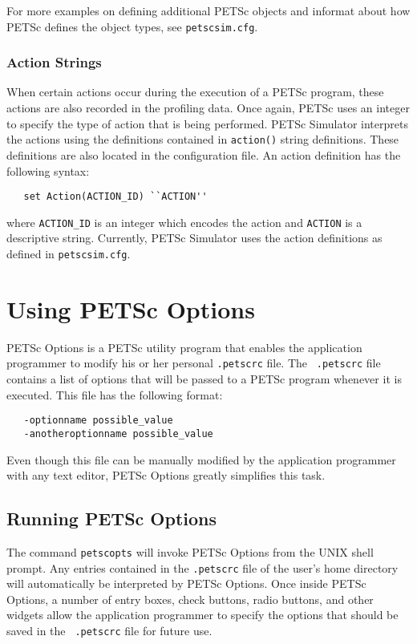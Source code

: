 For more examples on defining additional PETSc objects and informat
about how PETSc defines the object types, see {\tt petscsim.cfg}.

\subsubsection{Action Strings}

When certain actions occur during the execution of a PETSc program,
these actions are also recorded in the profiling data.  Once again,
PETSc uses an integer to specify the type of action that is being
performed.  PETSc Simulator interprets the actions using the
definitions contained in {\tt action()} string definitions.  These
definitions are also located in the configuration file.  An action
definition has the following syntax:
\begin{verbatim}
   set Action(ACTION_ID) ``ACTION''
\end{verbatim}
where {\tt ACTION\_ID} is an integer which encodes the action and {\tt ACTION} is a descriptive string.  Currently, PETSc Simulator uses the action definitions as defined in {\tt petscsim.cfg}.

\newpage

\section{Using PETSc Options}

PETSc Options is a PETSc utility program that enables the application
programmer to modify his or her personal {\tt .petscrc} file.  The {\tt
.petscrc} file contains a list of options that will be passed to
a PETSc program whenever it is executed.  This file has the
following format:
\begin{verbatim}
   -optionname possible_value
   -anotheroptionname possible_value
\end{verbatim}
Even though this file can be manually modified by the application
programmer with any text editor, PETSc Options greatly simplifies this
task.

\subsection{Running PETSc Options}

The command {\tt petscopts} will invoke PETSc Options from the UNIX
shell prompt.  Any entries contained in the {\tt .petscrc} file of the
user's home directory will automatically be interpreted by PETSc
Options.  Once inside PETSc Options, a number of entry boxes, check
buttons, radio buttons, and other widgets allow the application
programmer to specify the options that should be saved in the {\tt
.petscrc} file for future use.


